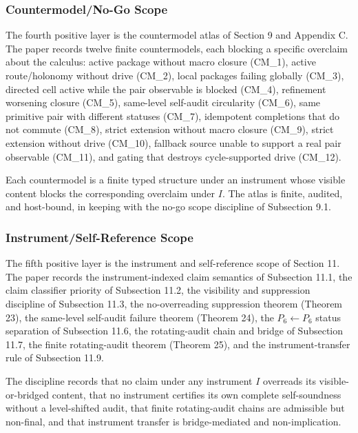 \documentclass[11pt]{article}
\theoremstyle{definition}
\begin{document}
\subsubsection{Countermodel/No-Go Scope}

The fourth positive layer is the countermodel atlas of Section 9 and Appendix C. The paper records twelve finite countermodels, each blocking a specific overclaim about the calculus: active package without macro closure (CM\_1), active route/holonomy without drive (CM\_2), local packages failing globally (CM\_3), directed cell active while the pair observable is blocked (CM\_4), refinement worsening closure (CM\_5), same-level self-audit circularity (CM\_6), same primitive pair with different statuses (CM\_7), idempotent completions that do not commute (CM\_8), strict extension without macro closure (CM\_9), strict extension without drive (CM\_10), fallback source unable to support a real pair observable (CM\_11), and gating that destroys cycle-supported drive (CM\_12).

Each countermodel is a finite typed structure under an instrument whose visible content blocks the corresponding overclaim under \(I\). The atlas is finite, audited, and host-bound, in keeping with the no-go scope discipline of Subsection 9.1.

\subsubsection{Instrument/Self-Reference Scope}

The fifth positive layer is the instrument and self-reference scope of Section 11. The paper records the instrument-indexed claim semantics of Subsection 11.1, the claim classifier priority of Subsection 11.2, the visibility and suppression discipline of Subsection 11.3, the no-overreading suppression theorem (Theorem 23), the same-level self-audit failure theorem (Theorem 24), the \(P_{6}\leftarrow P_{6}\) status separation of Subsection 11.6, the rotating-audit chain and bridge of Subsection 11.7, the finite rotating-audit theorem (Theorem 25), and the instrument-transfer rule of Subsection 11.9.

The discipline records that no claim under any instrument \(I\) overreads its visible-or-bridged content, that no instrument certifies its own complete self-soundness without a level-shifted audit, that finite rotating-audit chains are admissible but non-final, and that instrument transfer is bridge-mediated and non-implication.
\end{document}
